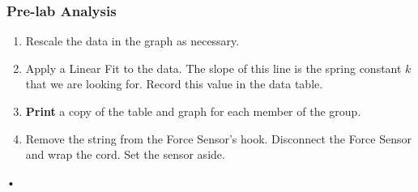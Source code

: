 \documentclass[main.tex]{subfiles}
\begin{document}
\subsubsection*{Pre-lab Analysis}
\begin{enumerate}
\item
Rescale the data in the graph as necessary.
\item
Apply a Linear Fit to the data. The slope of this line is the spring constant $k$ that we are looking for. Record this value in the data table.
\item
\textbf{Print} a copy of the table and graph for each member of the group.
\item
Remove the string from the Force Sensor's hook. Disconnect the Force Sensor and wrap the cord. Set the sensor aside.
\end{enumerate}•
\end{document}
